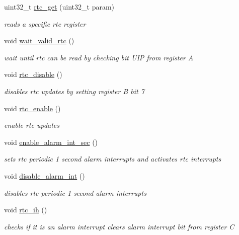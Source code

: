 \begin{DoxyCompactItemize}
uint32\+\_\+t \mbox{\hyperlink{group__rtc_gaad751240f0c6796cade2289071c711c9}{rtc\+\_\+get}} (uint32\+\_\+t param)
\begin{DoxyCompactList}\small\item\em reads a specific rtc register \end{DoxyCompactList}\item 
void \mbox{\hyperlink{group__rtc_ga74509feeac5ce275416f0239f4d92776}{wait\+\_\+valid\+\_\+rtc}} ()
\begin{DoxyCompactList}\small\item\em wait until rtc can be read by checking bit U\+IP from register A \end{DoxyCompactList}\item 
void \mbox{\hyperlink{group__rtc_gaeb55d907395f650cc700c948cfc6eadb}{rtc\+\_\+disable}} ()
\begin{DoxyCompactList}\small\item\em disables rtc updates by setting register B bit 7 \end{DoxyCompactList}\item 
void \mbox{\hyperlink{group__rtc_gac9d2c3fa04a4b1bc66a5175136feb12f}{rtc\+\_\+enable}} ()
\begin{DoxyCompactList}\small\item\em enable rtc updates \end{DoxyCompactList}\item 
void \mbox{\hyperlink{group__rtc_gab66aa80b8eeaab07c9b7d58bd55d915e}{enable\+\_\+alarm\+\_\+int\+\_\+sec}} ()
\begin{DoxyCompactList}\small\item\em sets rtc periodic 1 second alarm interrupts and activates rtc interrupts \end{DoxyCompactList}\item 
void \mbox{\hyperlink{group__rtc_ga30044c66dde8528c3f783e9847820e7c}{disable\+\_\+alarm\+\_\+int}} ()
\begin{DoxyCompactList}\small\item\em disables rtc periodic 1 second alarm interrupts \end{DoxyCompactList}\item 
void \mbox{\hyperlink{group__rtc_ga75dad42881d64cf07cf1bdc2979a7056}{rtc\+\_\+ih}} ()
\begin{DoxyCompactList}\small\item\em checks if it is an alarm interrupt clears alarm interrupt bit from register C \end{DoxyCompactList}\end{DoxyCompactItemize}
